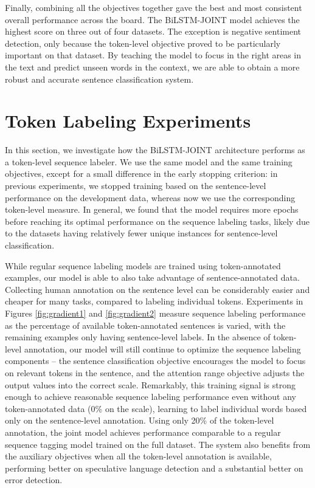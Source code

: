 \documentclass[letterpaper]{article} \usepackage{aaai19}  \usepackage{times}  \usepackage{helvet}  \usepackage{courier}  \usepackage{graphicx}
\begin{document}
Finally, combining all the objectives together gave the best and most consistent overall performance across the board. The {\small BiLSTM-JOINT} model achieves the highest  score on three out of four datasets. The exception is negative sentiment detection, only because the token-level objective proved to be particularly important on that dataset.
By teaching the model to focus in the right areas in the text and predict unseen words in the context, we are able to obtain a more robust and accurate sentence classification system.








\section{Token Labeling Experiments}

In this section, we investigate how the {\small BiLSTM-JOINT} architecture performs as a token-level sequence labeler. We use the same model and the same training objectives, except for a small difference in the early stopping criterion: in previous experiments, we stopped training based on the sentence-level performance on the development data, whereas now we use the corresponding token-level measure.  In general, we found that the model requires more epochs before reaching its optimal performance on the sequence labeling tasks, likely due to the datasets having relatively fewer unique instances for sentence-level classification.


While regular sequence labeling models are trained using token-annotated examples, our model is able to also take advantage of sentence-annotated data.
Collecting human annotation on the sentence level can be considerably easier and cheaper for many tasks, compared to labeling individual tokens.
Experiments in Figures \ref{fig:gradient1} and \ref{fig:gradient2} measure sequence labeling performance as the percentage of available token-annotated sentences is varied, with the remaining examples only having sentence-level labels. 
In the absence of token-level annotation, our model will still continue to optimize the sequence labeling components -- the sentence classification objective encourages the model to focus on relevant tokens in the sentence, and the attention range objective adjusts the output values into the correct scale.
Remarkably, this training signal is strong enough to achieve reasonable sequence labeling performance even without any token-annotated data (0\% on the scale), learning to label individual words based only on the sentence-level annotation.
Using only 20\% of the token-level annotation, the joint model achieves performance comparable to a regular sequence tagging model trained on the full dataset. The system also benefits from the auxiliary objectives when all the token-level annotation is available, performing  better on speculative language detection and a substantial  better on error detection.
\end{document}
